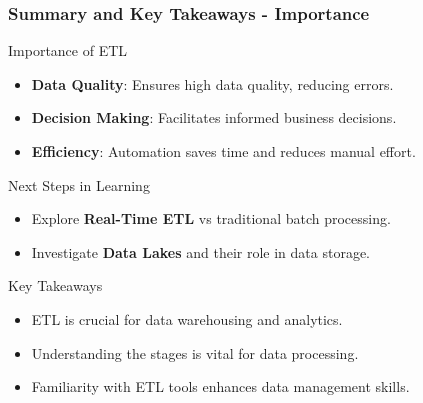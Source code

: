 \documentclass[aspectratio=169]{beamer}
\begin{document}
\begin{frame}[fragile]
    \frametitle{Summary and Key Takeaways - Importance}
    \begin{block}{Importance of ETL}
        \begin{itemize}
            \item \textbf{Data Quality}: Ensures high data quality, reducing errors.
            \item \textbf{Decision Making}: Facilitates informed business decisions.
            \item \textbf{Efficiency}: Automation saves time and reduces manual effort.
        \end{itemize}
    \end{block}

    \begin{block}{Next Steps in Learning}
        \begin{itemize}
            \item Explore \textbf{Real-Time ETL} vs traditional batch processing.
            \item Investigate \textbf{Data Lakes} and their role in data storage.
        \end{itemize}
    \end{block}
    
    \begin{block}{Key Takeaways}
        \begin{itemize}
            \item ETL is crucial for data warehousing and analytics.
            \item Understanding the stages is vital for data processing.
            \item Familiarity with ETL tools enhances data management skills.
        \end{itemize}
    \end{block}
\end{frame}
\end{document}
